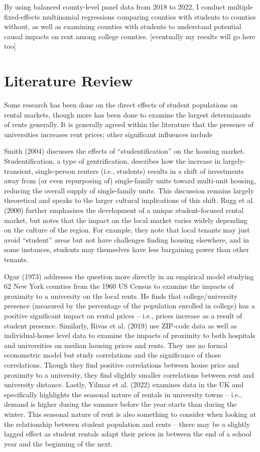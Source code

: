 \documentclass[12pt,english]{article}
\begin{document}
By using balanced county-level panel data from 2018 to 2022, I conduct multiple fixed-effects multinomial regressions comparing counties with students to counties without, as well as examining counties with students to understand potential causal impacts on rent among college counties. [eventually my results will go here too]

\section{Literature Review}\label{sec:litreview}
Some research has been done on the direct effects of student populations on rental markets, though more has been done to examine the largest determinants of rents generally. It is generally agreed within the literature that the presence of universities increases rent prices; other significant influences include 

Smith (2004) discusses the effects of “studentification” on the housing market. Studentification, a type of gentrification, describes how the increase in largely-transient, single-person renters (i.e., students) results in a shift of investments away from (or even repurposing of) single-family units toward multi-unit housing, reducing the overall supply of single-family units. This discussion remains largely theoretical and speaks to the larger cultural implications of this shift. Rugg et al. (2000) further emphasizes the development of a unique student-focused rental market, but notes that the impact on the local market varies widely depending on the culture of the region. For example, they note that local tenants may just avoid “student” areas but not have challenges finding housing elsewhere, and in some instances, students may themselves have less bargaining power than other tenants.

Ogur (1973) addresses the question more directly in an empirical model studying 62 New York counties from the 1960 US Census to examine the impacts of proximity to a university on the local rents. He finds that college/university presence (measured by the percentage of the population enrolled in college) has a positive significant impact on rental prices – i.e., prices increase as a result of student presence. Similarly, Rivas et al. (2019) use ZIP-code data as well as individual-house level data to examine the impacts of proximity to both hospitals and universities on median housing prices and rents. They use no formal econometric model but study correlations and the significance of those correlations. Though they find positive correlations between house price and proximity to a university, they find slightly smaller correlations between rent and university distance. Lastly, Yilmaz et al. (2022) examines data in the UK and specifically highlights the seasonal nature of rentals in university towns – i.e., demand is higher during the summer before the year starts than during the winter. This seasonal nature of rent is also something to consider when looking at the relationship between student population and rents – there may be a slightly lagged effect as student rentals adapt their prices in between the end of a school year and the beginning of the next. 
\end{document}
